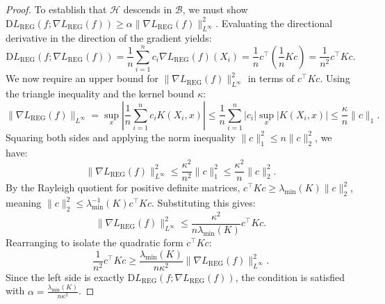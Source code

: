 \documentclass[10pt,a4paper]{amsart}
\newcommand{\D}{\mathrm{D}}
\begin{document}
\begin{proof}
    To establish that $\mathcal{H}$ descends in $\mathcal{B}$,
    we must show $\D L_\mathrm{REG}(f; \nabla L_\mathrm{REG}(f)) \geq \alpha \lVert \nabla L_\mathrm{REG}(f) \rVert_{L^\infty}^2$.
    Evaluating the directional derivative in the direction of the gradient yields:
    \[
        \D L_\mathrm{REG}(f; \nabla L_\mathrm{REG}(f)) = \frac{1}{n} \sum_{i=1}^n c_i \nabla L_\mathrm{REG}(f)(X_i) = \frac{1}{n} c^\top \left( \frac{1}{n} K c \right) = \frac{1}{n^2} c^\top K c.
    \]
    We now require an upper bound for $\lVert \nabla L_\mathrm{REG}(f) \rVert_{L^\infty}^2$ in terms of $c^\top K c$. Using the triangle inequality and the kernel bound $\kappa$:
    \[
        \lVert \nabla L_\mathrm{REG}(f) \rVert_{L^\infty} = \sup_{x} \left\lvert \frac{1}{n} \sum_{i=1}^n c_i K(X_i, x) \right\rvert \leq \frac{1}{n} \sum_{i=1}^n \lvert c_i \rvert \sup_{x} \lvert K(X_i, x) \rvert \leq \frac{\kappa}{n} \lVert c \rVert_1.
    \]
    Squaring both sides and applying the norm inequality $\lVert c \rVert_1^2 \leq n \lVert c \rVert_2^2$, we have:
    \[
        \lVert \nabla L_\mathrm{REG}(f) \rVert_{L^\infty}^2 \leq \frac{\kappa^2}{n^2} \lVert c \rVert_1^2 \leq \frac{\kappa^2}{n} \lVert c \rVert_2^2.
    \]
    By the Rayleigh quotient for positive definite matrices, $c^\top K c \geq \lambda_{\min}(K) \lVert c \rVert_2^2$, meaning $\lVert c \rVert_2^2 \leq \lambda_{\min}^{-1}(K) c^\top K c$. Substituting this gives:
    \[
        \lVert \nabla L_\mathrm{REG}(f) \rVert_{L^\infty}^2 \leq \frac{\kappa^2}{n \lambda_{\min}(K)} c^\top K c.
    \]
    Rearranging to isolate the quadratic form $c^\top K c$:
    \[
        \frac{1}{n^2} c^\top K c \geq \frac{\lambda_{\min}(K)}{n \kappa^2} \lVert \nabla L_\mathrm{REG}(f) \rVert_{L^\infty}^2.
    \]
    Since the left side is exactly $\D L_\mathrm{REG}(f; \nabla L_\mathrm{REG}(f))$, the condition is satisfied with $\alpha = \frac{\lambda_{\min}(K)}{n \kappa^2}$.
\end{proof}
\end{document}
